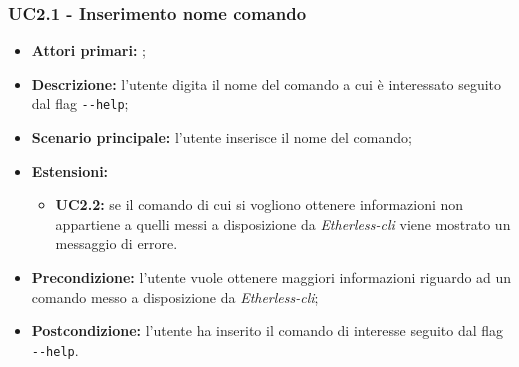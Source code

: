\subsubsection{UC2.1 - Inserimento nome comando}
\begin{itemize}
	\item \textbf{Attori primari:} \ug{};
	\item \textbf{Descrizione:}  l’utente digita il nome del comando a cui è interessato seguito dal flag \texttt{-{}-help};
	\item \textbf{Scenario principale:} l’utente inserisce il nome del comando; 
	\item \textbf{Estensioni:} 
	\begin{itemize}
		\item \textbf{UC2.2:} se il comando di cui si vogliono ottenere informazioni non appartiene a quelli messi a disposizione da \textit{Etherless-cli} viene mostrato un messaggio di errore. 
	\end{itemize}
	\item \textbf{Precondizione:} l’utente vuole ottenere maggiori informazioni riguardo ad un comando messo a disposizione da \textit{Etherless-cli}; 
	\item \textbf{Postcondizione:} l’utente ha inserito il comando di interesse seguito dal flag \texttt{-{}-help}.
\end{itemize}